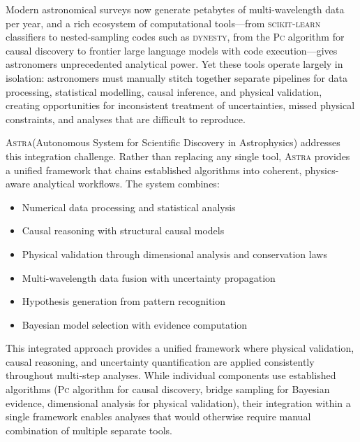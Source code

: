 \documentclass[fleqn,usenatbib]{mnras}
\newcommand{\astra}{\textsc{Astra}\xspace}
\newcommand{\pc}{\textsc{Pc}\xspace}
\begin{document}
Modern astronomical surveys now generate petabytes of multi-wavelength data per year, and a rich ecosystem of computational tools---from \textsc{scikit-learn} classifiers to nested-sampling codes such as \textsc{dynesty}, from the \pc algorithm for causal discovery to frontier large language models with code execution---gives astronomers unprecedented analytical power.
Yet these tools operate largely in isolation: astronomers must manually stitch together separate pipelines for data processing, statistical modelling, causal inference, and physical validation, creating opportunities for inconsistent treatment of uncertainties, missed physical constraints, and analyses that are difficult to reproduce.

\astra (Autonomous System for Scientific Discovery in Astrophysics) addresses this integration challenge.
Rather than replacing any single tool, \astra provides a unified framework that chains established algorithms into coherent, physics-aware analytical workflows.
The system combines:
\begin{itemize}
  \item Numerical data processing and statistical analysis
  \item Causal reasoning with structural causal models
  \item Physical validation through dimensional analysis and conservation laws
  \item Multi-wavelength data fusion with uncertainty propagation
  \item Hypothesis generation from pattern recognition
  \item Bayesian model selection with evidence computation
\end{itemize}

This integrated approach provides a unified framework where physical validation, causal reasoning, and uncertainty quantification are applied consistently throughout multi-step analyses.
While individual components use established algorithms (\pc algorithm for causal discovery, bridge sampling for Bayesian evidence, dimensional analysis for physical validation), their integration within a single framework enables analyses that would otherwise require manual combination of multiple separate tools.
\end{document}
